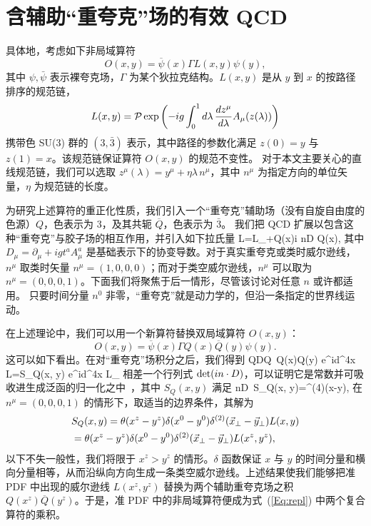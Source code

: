 \section{含辅助“重夸克”场的有效 QCD}

具体地，考虑如下非局域算符
\begin{equation}\label{Eq:nonlocalop}
 O(x,y) = \overline{\psi}(x) \Gamma L(x,y)\psi(y),
\end{equation}
其中 $\psi, \bar\psi$ 表示裸夸克场，$\Gamma$ 为某个狄拉克结构。$L(x, y)$ 是从 $y$ 到 $x$ 的按路径排序的规范链，
\begin{equation}
             L(x, y) = {\cal P}\exp\left(-ig\int^1_0 d\lambda\,\frac{dz^\mu}{d\lambda}  A_\mu(z(\lambda))\right)
\end{equation}
携带色 SU(3) 群的 $(3,\bar 3)$ 表示，其中路径的参数化满足 $z(0)=y$ 与 $z(1)=x$。该规范链保证算符 $O(x,y)$ 的规范不变性。
对于本文主要关心的直线规范链，我们可以选取 $z^\mu(\lambda)=y^\mu+\eta\lambda\, n^\mu$，其中 $n^\mu$ 为指定方向的单位矢量，$\eta$ 为规范链的长度。

为研究上述算符的重正化性质，我们引入一个“重夸克”辅助场（没有自旋自由度的色源）$Q$，色表示为 3，及其共轭 ${\overline Q}$，色表示为 ${\bar 3}$。
我们把 QCD 扩展以包含这种“重夸克”与胶子场的相互作用，并引入如下拉氏量
\beq\label{Eq:lag}
{\cal L}={\cal L_{}}+\overline Q(x)i n\cdot D Q(x),
\eeq
其中 $D_\mu=\partial_\mu+igt^a A^a_\mu$ 是基础表示下的协变导数。对于真实重夸克或类时威尔逊线，$n^\mu$ 取类时矢量 $n^\mu=(1,0,0,0)$；而对于类空威尔逊线，$n^\mu$ 可以取为 $n^\mu=(0,0,0,1)$。下面我们将聚焦于后一情形，尽管该讨论对任意 $n$ 或许都适用。
只要时间分量 $n^0$ 非零，“重夸克”就是动力学的，但沿一条指定的世界线运动。

在上述理论中，我们可以用一个新算符替换双局域算符 $O(x,y)$：
\begin{equation}\label{Eq:repl}
             O(x, y) = \overline{\psi}(x)\Gamma Q(x) \overline{Q}(y) \psi(y).
\end{equation}
这可以如下看出。在对“重夸克”场积分之后，我们得到
\beq
{}\overline Q{\cal D}Q\, Q(x)\overline Q(y) e^{i\int d^4x {\cal L}}=S_Q(x, y) e^{i\int d^4x {\cal L_{}}}
\eeq
相差一个行列式 ${\rm det}(in\cdot D)$，可以证明它是常数并可吸收进生成泛函的归一化之中~\cite{Mannel:1991mc}，其中 $S_Q(x, y)$ 满足
\beq
n\cdot D\, S_Q(x, y)=\delta^{(4)}(x-y),
\eeq
在 $n^\mu=(0,0,0,1)$ 的情形下，取适当的边界条件，其解为
\begin{align}
&S_Q(x,y)=\theta(x^z-y^z)\delta(x^0-y^0)\delta^{(2)}(\vec x_\perp-\vec y_\perp)L(x,y)\nonumber\\
&=\theta(x^z-y^z)\delta(x^0-y^0)\delta^{(2)}(\vec x_\perp-\vec y_\perp)L(x^z,y^z),
\end{align}
以下不失一般性，我们将限于 $x^z>y^z$ 的情形。$\delta$ 函数保证 $x$ 与 $y$ 的时间分量和横向分量相等，从而沿纵向方向生成一条类空威尔逊线。上述结果使我们能够把准 PDF 中出现的威尔逊线 $L(x^z,y^z)$ 替换为两个辅助重夸克场之积 $Q(x^z)\overline Q(y^z)$。于是，准 PDF 中的非局域算符便成为式~(\ref{Eq:repl}) 中两个复合算符的乘积。
